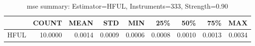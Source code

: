 \begin{table}[ht]
\centering
\caption{mse summary: Estimator=HFUL, Instruments=333, Strength=0.90}
\begin{tabular}{lrrrrrrrr}
\toprule
 & COUNT & MEAN & STD & MIN & 25\% & 50\% & 75\% & MAX \\
\midrule
HFUL & 10.0000 & 0.0014 & 0.0009 & 0.0006 & 0.0008 & 0.0010 & 0.0013 & 0.0034 \\
\bottomrule
\end{tabular}
\end{table}
